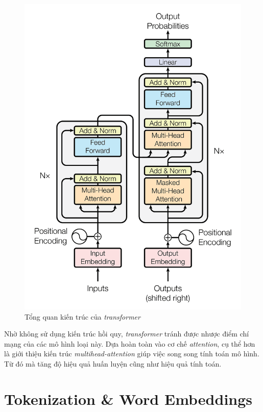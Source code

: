 \begin{figure}[H]
    \begin{center}
        \includegraphics[scale=0.25]{images/attention-is-all-you-need}
        \caption{Tổng quan kiến trúc của \textit{ \textit{transformer} }}
        \label{fig:attetion-is-all-you-need}
    \end{center}
\end{figure}

Nhờ không sử dụng kiến trúc hồi quy, \textit{ \textit{transformer} } tránh được nhược điểm chí mạng của các mô hình loại này. Dựa hoàn toàn vào cơ chế \textit{attention}, cụ thể hơn là giới thiệu kiến trúc \textit{multihead-attention} giúp việc song song tính toán mô hình. Từ đó mà tăng độ hiệu quả huấn luyện cũng như hiệu quả tính toán.

\section{Tokenization \& Word Embeddings}


